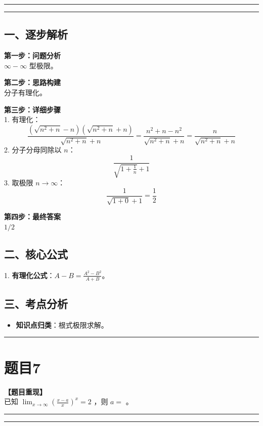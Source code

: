\documentclass[12pt, a4paper]{ctexart}
\newcommand{\TopSeparator}{
    \par\noindent\rule{\textwidth}{1.5pt}\vspace{0.5em} %
}
\newcommand{\AnalysisSeparator}{
    \par\noindent\rule{\textwidth}{0.5pt}\vspace{0.2em}\hrule\vspace{0.5em} %
}
\newenvironment{RedAnalysis}{
    \par
    \color{red} %
}{
    \par
    \color{black} %
}
\begin{document}
\AnalysisSeparator

\begin{RedAnalysis}

\subsection*{一、逐步解析}

\textbf{第一步：问题分析} \\
$\infty - \infty$ 型极限。

\textbf{第二步：思路构建} \\
分子有理化。

\textbf{第三步：详细步骤} \\
1. 有理化：
   \[ \frac{(\sqrt{n^2+n}-n)(\sqrt{n^2+n}+n)}{\sqrt{n^2+n}+n} = \frac{n^2+n-n^2}{\sqrt{n^2+n}+n} = \frac{n}{\sqrt{n^2+n}+n} \]
2. 分子分母同除以 $n$：
   \[ \frac{1}{\sqrt{1+\frac{1}{n}}+1} \]
3. 取极限 $n \to \infty$：
   \[ \frac{1}{\sqrt{1+0}+1} = \frac{1}{2} \]

\textbf{第四步：最终答案} \\
$1/2$

\subsection*{二、核心公式}
1. \textbf{有理化公式}：$A-B = \frac{A^2-B^2}{A+B}$。

\subsection*{三、考点分析}
\begin{itemize}
    \item \textbf{知识点归类}：根式极限求解。
\end{itemize}

\end{RedAnalysis}

\vspace{2em}

\TopSeparator
\section*{题目7}

\textbf{【题目重现】} \\
已知 $ \lim_{x\to\infty}\left(\frac{x-a}{x}\right)^x=2 $ ，则 $a=$ \underline{\hspace{2cm}}。

\AnalysisSeparator
\end{document}

